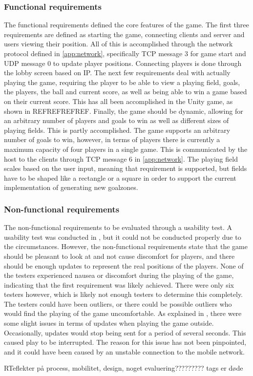 \subsubsection{Functional requirements}
The functional requirements defined the core features of the game.
The first three requirements are defined as starting the game, connecting clients and server and users viewing their position.
All of this is accomplished through the network protocol defined in \autoref{app:network}, specifically TCP message 3 for game start and UDP message 0 to update player positions.
Connecting players is done through the lobby screen based on IP.
The next few requirements deal with actually playing the game, requiring the player to be able to view a playing field, goals, the players, the ball and current score, as well as being able to win a game based on their current score.
This has all been accomplished in the Unity game, as shown in REFREFREFREF.
Finally, the game should be dynamic, allowing for an arbitrary number of players and goals to win as well as different sizes of playing fields.
This is partly accomplished.
The game supports an arbitrary number of goals to win, however, in terms of players there is currently a maximum capacity of four players in a single game.
This is communicated by the host to the clients through TCP message 6 in \autoref{app:network}.
The playing field scales based on the user input, meaning that requirement is supported, but fields have to be shaped like a rectangle or a square in order to support the current implementation of generating new goalzones.

\subsubsection{Non-functional requirements}
The non-functional requirements to be evaluated through a usability test.
A usability test was conducted in , but it could not be conducted properly due to the circumstances.
However, the non-functional requirements state that the game should be pleasant to look at and not cause discomfort for players, and there should be enough updates to represent the real positions of the players.
None of the testers experienced nausea or discomfort during the playing of the game, indicating that the first requirement was likely achieved.
There were only six testers however, which is likely not enough testers to determine this completely.
The testers could have been outliers, or there could be possible outliers who would find the playing of the game uncomfortable.
As explained in , there were some slight issues in terms of updates when playing the game outside.
Occasionally, updates would stop being sent for a period of several seconds.
This caused play to be interrupted.
The reason for this issue has not been pinpointed, and it could have been caused by an unstable connection to the mobile network.



RTeflekter på process, mobilitet, design, noget evaluering?????????
tags 
er døde

